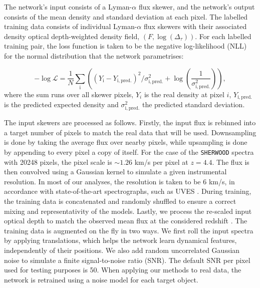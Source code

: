 The network's input consists of a Lyman-$\alpha$ flux skewer, and the network's output consists of the mean density and standard deviation at each pixel. The labelled training data consists of individual Lyman-$\alpha$ flux skewers with their associated density optical depth-weighted density field, $(F,\log(\Delta_\tau))$. For each labelled training pair, the loss function is taken to be the negative log-likelihood (NLL) for the normal distribution that the network parametrises:

\begin{equation}\label{eq:our loss}
    -\log\mathcal{L}=\frac{1}{N}\sum_{{\mathrm{i}}}\left((Y_{{\mathrm{i}}}-Y_{{\mathrm{i},\mathrm{pred}.}})^{2}/\sigma_{{\mathrm{i},\mathrm{pred}.}}^{2}+\log(\frac{1}{\sigma_{{\mathrm{i},\mathrm{pred}.}}^{2}})\right),
\end{equation}
where the sum runs over all skewer pixels, $Y_i$ is the real density at pixel $i$, $Y_{{\mathrm{i},\mathrm{pred}.}}$ is the predicted expected density and $\sigma_{{\mathrm{i},\mathrm{pred}.}}^{2}$ the predicted standard deviation.

The input skewers are processed as follows. Firstly, the input flux is rebinned into a target number of pixels to match the real data that will be used. Downsampling is done by taking the average flux over nearby pixels, while upsampling is done by appending to every pixel a copy of itself. For the case of the \texttt{SHERWOOD} spectra with 20248 pixels, the pixel scale is $\sim 1.26$ km/s per pixel at $z=4.4$. The flux is then convolved using a Gaussian kernel to simulate a given instrumental resolution. In most of our analyses, the resolution is taken to be $6$ km/s, in accordance with state-of-the-art spectrographs, such as UVES \cite{UVES}. During training, the training data is concatenated and randomly shuffled to ensure a correct mixing and representativity of the models. Lastly, we process the re-scaled input optical depth to match the observed mean flux at the considered redshift \cite{Becker_mean_flux}.
The training data is augmented on the fly in two ways. We first roll the input spectra by applying translations, which helps the network learn dynamical features, independently of their positions. We also add random uncorrelated Gaussian noise to simulate a finite signal-to-noise ratio (SNR). The default SNR per pixel used for testing purposes is 50. When applying our methods to real data, the network is retrained using a noise model for each target object.


